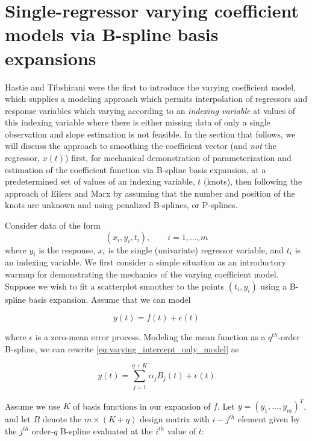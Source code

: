 \documentclass[12pt]{article}
\theoremstyle{definition}
\begin{document}
\section{Single-regressor varying coefficient models via B-spline basis expansions}

Hastie and Tibshirani were the first to introduce the varying coefficient model, which supplies a modeling approach which permits interpolation of regressors and response variables which varying according to an \emph{indexing variable} at values of this indexing variable where there is either missing data of only a single observation and slope estimation is not feasible. In the section that follows, we will discuss the approach to smoothing the coefficient vector (and \emph{not} the regressor, $x\left(t\right)$) first, for mechanical demonstration of parameterization and estimation of the coefficient function via B-spline basis expansion, at a predetermined set of values of an indexing variable, $t$ (knots), then following the approach of Eilers and Marx by assuming that the number and position of the knots are unknown and using penalized B-splines, or P-splines. 

Consider data of the form 
\[
\left(x_i, y_i, t_i\right), \qquad i=1,\dots,m
\]
where $y_i$ is the response, $x_i$ is the single (univariate) regressor variable, and $t_i$ is an indexing variable. We first consider a simple situation as an introductory warmup for demonstrating the mechanics of the varying coefficient model. Suppose we wish to fit a scatterplot smoother to the points $\left(t_i, y_i\right)$ using a B-spline basis expansion. Assume that we can model 

\begin{equation} \label{eq:varying_intercept_only_model}
y\left(t\right) = f\left(t\right) + \epsilon\left(t \right)
\end{equation}

where $\epsilon$ is a zero-mean error process.  Modeling the mean function as a $q^{th}$-order B-spline, we can rewrite \ref{eq:varying_intercept_only_model} as

\begin{equation} \label{eq:varying_intercept_only_model_bspline}
y\left(t\right) = \sum_{j=1}^{q+K} \alpha_j B_j\left(t\right) + \epsilon\left(t \right)
\end{equation}

Assume we use $K$ of basis functions in our expansion of $f$. Let $y= \left(y_1,\dots,y_m\right)^T$, and let $B$ denote the $m \times \left(K+q\right)$ design matrix with $i-j^{th}$ element given by the $j^{th}$ order-$q$ B-spline evaluated at the $i^{th}$ value of $t$: 
\end{document}
